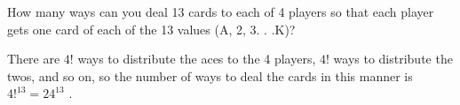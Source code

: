 \question How many ways can you deal 13 cards to each of 4 players 
so that each player gets one card of each of the 13 values 
(A, 2, 3. . .K)? 
\begin{solution}[1 cm]
There are $4!$ ways to distribute the aces to the 4 players, $4!$ ways to distribute the twos, and so 
on, so the number of ways to deal the cards in this manner is 
$4!^{13} = 24^{13}$ .
\end{solution}
